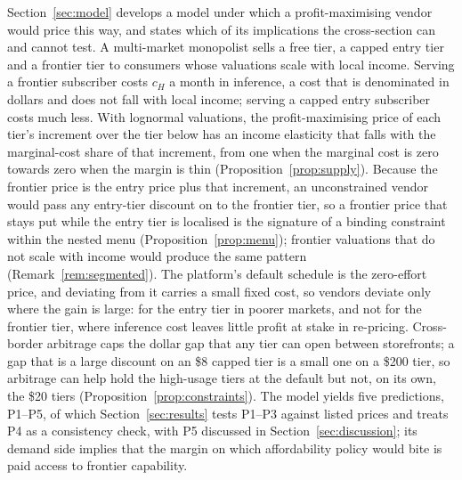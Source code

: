 \documentclass[11pt]{article}
\theoremstyle{definition}
\theoremstyle{remark}
\begin{document}
Section~\ref{sec:model} develops a model under which a profit-maximising vendor would price this way, and states which of its implications the cross-section can and cannot test. A multi-market monopolist sells a free tier, a capped entry tier and a frontier tier to consumers whose valuations scale with local income. Serving a frontier subscriber costs $c_H$ a month in inference, a cost that is denominated in dollars and does not fall with local income; serving a capped entry subscriber costs much less. With lognormal valuations, the profit-maximising price of each tier's increment over the tier below has an income elasticity that falls with the marginal-cost share of that increment, from one when the marginal cost is zero towards zero when the margin is thin (Proposition~\ref{prop:supply}). Because the frontier price is the entry price plus that increment, an unconstrained vendor would pass any entry-tier discount on to the frontier tier, so a frontier price that stays put while the entry tier is localised is the signature of a binding constraint within the nested menu (Proposition~\ref{prop:menu}); frontier valuations that do not scale with income would produce the same pattern (Remark~\ref{rem:segmented}). The platform's default schedule is the zero-effort price, and deviating from it carries a small fixed cost, so vendors deviate only where the gain is large: for the entry tier in poorer markets, and not for the frontier tier, where inference cost leaves little profit at stake in re-pricing. Cross-border arbitrage caps the dollar gap that any tier can open between storefronts; a gap that is a large discount on an \$8 capped tier is a small one on a \$200 tier, so arbitrage can help hold the high-usage tiers at the default but not, on its own, the \$20 tiers (Proposition~\ref{prop:constraints}). The model yields five predictions, P1--P5, of which Section~\ref{sec:results} tests P1--P3 against listed prices and treats P4 as a consistency check, with P5 discussed in Section~\ref{sec:discussion}; its demand side implies that the margin on which affordability policy would bite is paid access to frontier capability.
\end{document}
